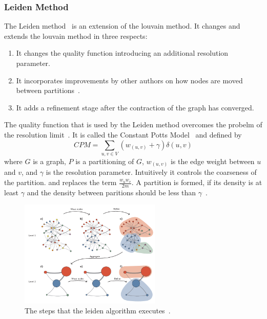             \subsubsection*{Leiden Method}
                The Leiden method~\autocite{traag2019louvain} is an extension of the louvain method.
                It changes and extends the louvain method in three respects:
                \begin{enumerate}
                 \item It changes the quality function introducing an additional resolution parameter.
                 \item It incorporates improvements by other authors on how nodes are moved between partitions~\autocite{movd,movc,movb,mova}.
                 \item It adds a refinement stage after the contraction of the graph has converged.
                \end{enumerate}
                The quality function that is used by the Leiden method overcomes the probelm of the resolution limit~\autocite{traag2011narrow, fortunato2007resolution}.
                It is called the Constant Potts Model~\autocite{potts1952some, traag2011narrow} and defined by 
                \[ CPM = \sum_{u,v \in V}(w_{(u,v)} + \gamma) \delta(u, v) \]
                where $G$ is a graph, $P$ is a partitioning of $G$, $w_{(u,v)}$ is the edge weight between $u$ and $v$, and $\gamma$ is the resolution parameter. 
                Intuitively it controls the coarseness of the partition. and replaces the term $\frac{w_u w_v}{2m}$.
                A partition is formed, if its density is at least $\gamma$ and the density between paritions should be less than $\gamma$~\autocite{traag2019louvain}.
                
                \begin{figure}[htp]
                    \begin{center}
                        \includegraphics[keepaspectratio,width=0.6\textwidth]{img/03-graphs/leiden.png}
                    \end{center}
                    \caption{The steps that the leiden algorithm executes~\autocite{traag2019louvain}.} 
                    \label{leiden-fig}
                \end{figure}
                
